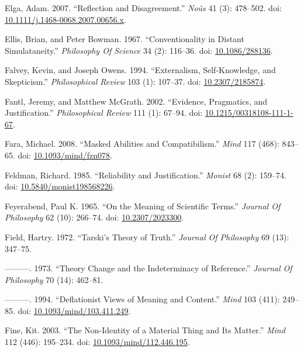 \documentclass[
  10pt,
  letterpaper,
  DIV=11,
  numbers=noendperiod,
  twoside]{scrartcl}
\newlength{\cslhangindent}
\newenvironment{CSLReferences}[2] %
 {\begin{list}{}{%
  \setlength{\itemindent}{0pt}
  \setlength{\leftmargin}{0pt}
  \setlength{\parsep}{0pt}
  \ifodd #1
   \setlength{\leftmargin}{\cslhangindent}
   \setlength{\itemindent}{-1\cslhangindent}
  \fi
  \setlength{\itemsep}{#2\baselineskip}}}
 {\end{list}}
\begin{document}
\begin{CSLReferences}{1}{0}
Elga, Adam. 2007. {``Reflection and Disagreement.''} \emph{Noûs} 41 (3):
478--502. doi:
\href{https://doi.org/10.1111/j.1468-0068.2007.00656.x}{10.1111/j.1468-0068.2007.00656.x}.

Ellis, Brian, and Peter Bowman. 1967. {``Conventionality in Distant
Simulataneity.''} \emph{Philosophy Of Science} 34 (2): 116--36. doi:
\href{https://doi.org/10.1086/288136}{10.1086/288136}.

Falvey, Kevin, and Joseph Owens. 1994. {``Externalism, Self-Knowledge,
and Skepticism.''} \emph{Philosophical Review} 103 (1): 107--37. doi:
\href{https://doi.org/10.2307/2185874}{10.2307/2185874}.

Fantl, Jeremy, and Matthew McGrath. 2002. {``Evidence, Pragmatics, and
Justification.''} \emph{Philosophical Review} 111 (1): 67--94. doi:
\href{https://doi.org/10.1215/00318108-111-1-67}{10.1215/00318108-111-1-67}.

Fara, Michael. 2008. {``Masked Abilities and Compatibilism.''}
\emph{Mind} 117 (468): 843--65. doi:
\href{https://doi.org/10.1093/mind/fzn078}{10.1093/mind/fzn078}.

Feldman, Richard. 1985. {``Reliability and Justification.''}
\emph{Monist} 68 (2): 159--74. doi:
\href{https://doi.org/10.5840/monist198568226}{10.5840/monist198568226}.

Feyerabend, Paul K. 1965. {``On the Meaning of Scientific Terms.''}
\emph{Journal Of Philosophy} 62 (10): 266--74. doi:
\href{https://doi.org/10.2307/2023300}{10.2307/2023300}.

Field, Hartry. 1972. {``Tarski's Theory of Truth.''} \emph{Journal Of
Philosophy} 69 (13): 347--75.

---------. 1973. {``Theory Change and the Indeterminacy of Reference.''}
\emph{Journal Of Philosophy} 70 (14): 462--81.

---------. 1994. {``Deflationist Views of Meaning and Content.''}
\emph{Mind} 103 (411): 249--85. doi:
\href{https://doi.org/10.1093/mind/103.411.249}{10.1093/mind/103.411.249}.

Fine, Kit. 2003. {``The Non-Identity of a Material Thing and Its
Matter.''} \emph{Mind} 112 (446): 195--234. doi:
\href{https://doi.org/10.1093/mind/112.446.195}{10.1093/mind/112.446.195}.


\end{CSLReferences}
\end{document}
